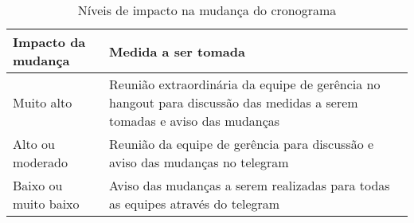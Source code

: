   \begin{table}[!htb]
    \centering
    \begin{tabular}{p{5cm}p{10cm}}
      \toprule
        \textbf{Impacto da mudança} & \textbf{Medida a ser tomada} \\
      \midrule
        Muito alto           & Reunião extraordinária da equipe de gerência no hangout para discussão das medidas a serem tomadas e
                               aviso das mudanças \\ \midrule
        Alto ou moderado     & Reunião da equipe de gerência para discussão e aviso das mudanças no telegram \\ \midrule
        Baixo ou muito baixo & Aviso das mudanças a serem realizadas para todas as equipes através do telegram \\
      \bottomrule
    \end{tabular}
    \caption{Níveis de impacto na mudança do cronograma}
  \end{table}

